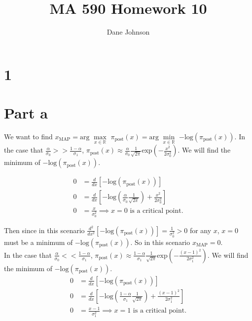 \documentclass[11pt]{article}
\title{MA 590 Homework 10}
\author{Dane Johnson}
\begin{document}
\maketitle

\section*{1}

\section*{Part a}

We want to find $x_{\text{MAP}} = \text{arg } \underset{x\in \mathbb{R}}{\max}$ $ \pi_{\text{post}}(x) = \text{arg } \underset{x\in \mathbb{R}}{\min}$ $ -\text{log}\left(\pi_{\text{post}}(x)\right)$. In the case that $\frac{\alpha}{\sigma_0} >> \frac{1-\alpha}{\sigma_1}$, $\pi_{\text{post}}(x) \approx \frac{\alpha}{\sigma_0}\frac{1}{\sqrt{2\pi}}\text{exp}\left(-\frac{x^2}{2\sigma_0^2}\right)$. We will find the minimum of $-\text{log}\left(\pi_{\text{post}}(x)\right)$.

\begin{align*}
0 &= \frac{d}{dx} \left[-\text{log}\left(\pi_{\text{post}}(x)\right) \right] \\
0 &= \frac{d}{dx} \left[-\text{log}\left(\frac{\alpha}{\sigma_0}\frac{1}{\sqrt{2\pi}}\right) + \frac{x^2}{2\sigma_0^2} \right]\\
0& = \frac{x}{\sigma_0^2} \implies x = 0 \text{ is a critical point.}
\end{align*}

Then since in this scenario $\frac{d^2}{dx^2} \left[-\text{log}\left(\pi_{\text{post}}(x)\right) \right] = \frac{1}{\sigma_0^2} > 0$ for any $x$, $x=0$ must be a minimum of $-\text{log}\left(\pi_{\text{post}}(x)\right)$. So in this scenario $x_{\text{MAP}} = 0$. \\

In the case that $\frac{\alpha}{\sigma_0} << \frac{1-\alpha}{\sigma_1}$, $\pi_{\text{post}}(x) \approx \frac{1-\alpha}{\sigma_1}\frac{1}{\sqrt{2\pi}}\text{exp}\left(-\frac{(x-1)^2}{2\sigma_1^2}\right)$. We will find the minimum of $-\text{log}\left(\pi_{\text{post}}(x)\right)$.
\begin{align*}
0 &= \frac{d}{dx} \left[-\text{log}\left(\pi_{\text{post}}(x)\right) \right] \\
0 &= \frac{d}{dx} \left[-\text{log}\left(\frac{1-\alpha}{\sigma_1}\frac{1}{\sqrt{2\pi}}\right) + \frac{(x-1)^2}{2\sigma_1^2}\right]\\
0&= \frac{x-1}{\sigma_1^2} \implies x = 1 \text{ is a critical point.}
\end{align*}
\end{document}
